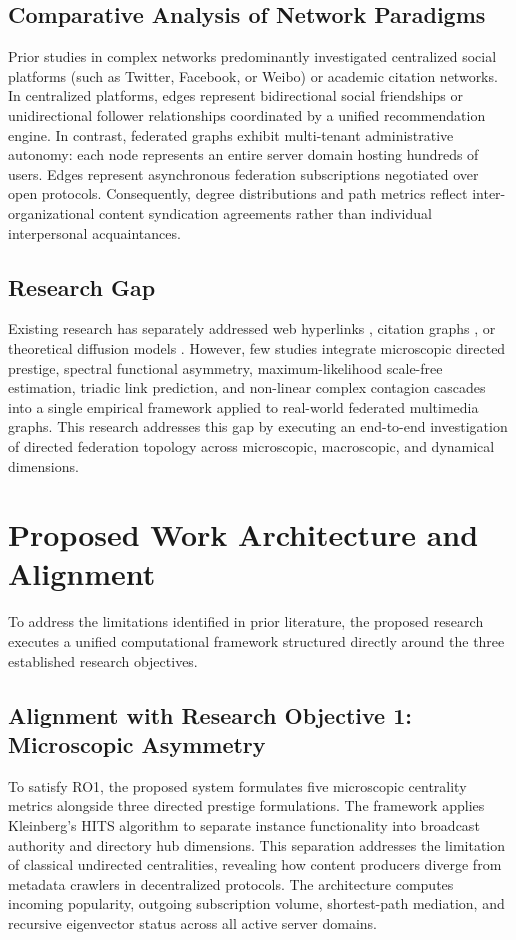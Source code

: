 \documentclass[conference]{IEEEtran}
\begin{document}
\subsection{Comparative Analysis of Network Paradigms}
Prior studies in complex networks predominantly investigated centralized social platforms (such as Twitter, Facebook, or Weibo) or academic citation networks. In centralized platforms, edges represent bidirectional social friendships or unidirectional follower relationships coordinated by a unified recommendation engine. In contrast, federated graphs exhibit multi-tenant administrative autonomy: each node represents an entire server domain hosting hundreds of users. Edges represent asynchronous federation subscriptions negotiated over open protocols. Consequently, degree distributions and path metrics reflect inter-organizational content syndication agreements rather than individual interpersonal acquaintances.

\subsection{Research Gap}
Existing research has separately addressed web hyperlinks \cite{page1999pagerank,kleinberg1999authoritative}, citation graphs \cite{liben2007link}, or theoretical diffusion models \cite{granovetter1978threshold,centola2007complex}. However, few studies integrate microscopic directed prestige, spectral functional asymmetry, maximum-likelihood scale-free estimation, triadic link prediction, and non-linear complex contagion cascades into a single empirical framework applied to real-world federated multimedia graphs. This research addresses this gap by executing an end-to-end investigation of directed federation topology across microscopic, macroscopic, and dynamical dimensions.

\section{Proposed Work Architecture and Alignment}

To address the limitations identified in prior literature, the proposed research executes a unified computational framework structured directly around the three established research objectives.

\subsection{Alignment with Research Objective 1: Microscopic Asymmetry}
To satisfy RO1, the proposed system formulates five microscopic centrality metrics alongside three directed prestige formulations. The framework applies Kleinberg's HITS algorithm to separate instance functionality into broadcast authority and directory hub dimensions. This separation addresses the limitation of classical undirected centralities, revealing how content producers diverge from metadata crawlers in decentralized protocols. The architecture computes incoming popularity, outgoing subscription volume, shortest-path mediation, and recursive eigenvector status across all active server domains.
\end{document}
